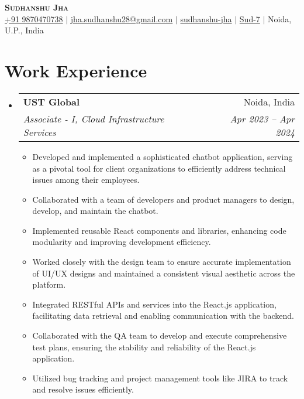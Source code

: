 \documentclass[letterpaper,10pt]{article}
\makeatletter
\newcommand{\resumeItem}[1]{
  \item\small{
    {#1 \vspace{-2pt}}
  }
}
\newcommand{\resumeSubheading}[4]{
  \vspace{-2pt}\item
    \begin{tabular*}{0.97\textwidth}[t]{l@{\extracolsep{\fill}}r}
      \textbf{#1} & #2 \\
      \textit{\small#3} & \textit{\small #4} \\
    \end{tabular*}\vspace{-7pt}
}
\newcommand{\resumeSubHeadingListStart}{\begin{itemize}[leftmargin=0.15in, label={}]}
\newcommand{\resumeSubHeadingListEnd}{\end{itemize}}
\newcommand{\resumeItemListStart}{\begin{itemize}}
\newcommand{\resumeItemListEnd}{\end{itemize}\vspace{-5pt}}
\makeatother
\begin{document}
\begin{center}
    \textbf{\Huge \scshape Sudhanshu Jha} \\ \vspace{3pt}
    \small
    \faMobile \hspace{.5pt} \href{tel:9870470738}{+91 9870470738}
    $|$
    \faAt \hspace{.5pt} \href{mailto:jha.sudhanshu28@gmail.com}{jha.sudhanshu28@gmail.com}
    $|$
    \faLinkedinSquare \hspace{.5pt} \href{https://www.linkedin.com/in/sudhanshu-jha28/}{sudhanshu-jha}
    $|$
    \faGithub \hspace{.5pt} \href{https://github.com/Sud-7}{Sud-7}
    $|$
    \faMapMarker \hspace{.5pt} Noida, U.P., India
\end{center}

\section{Work Experience}
  \vspace{3pt}
  \resumeSubHeadingListStart
    \resumeSubheading
      {UST Global}{Noida, India}
      {Associate - I, Cloud Infrastructure Services}{Apr 2023 -- Apr 2024}
        \resumeItemListStart
            \resumeItem{Developed and implemented a sophisticated chatbot application, serving as a pivotal tool for client organizations to efficiently address technical issues among their employees.}
            \resumeItem{Collaborated with a team of developers and product managers to design, develop, and maintain the chatbot.}
            \resumeItem{Implemented reusable React components and libraries, enhancing code modularity and improving development efficiency.}
            \resumeItem{Worked closely with the design team to ensure accurate implementation of UI/UX designs and maintained a consistent visual aesthetic across the platform.}
            \resumeItem{Integrated RESTful APIs and services into the React.js application, facilitating data retrieval and enabling communication with the backend.}
            \resumeItem{Collaborated with the QA team to develop and execute comprehensive test plans, ensuring the stability and reliability of the React.js application.}
            \resumeItem{Utilized bug tracking and project management tools like JIRA to track and resolve issues efficiently.}
        \resumeItemListEnd
  \resumeSubHeadingListEnd
\end{document}
